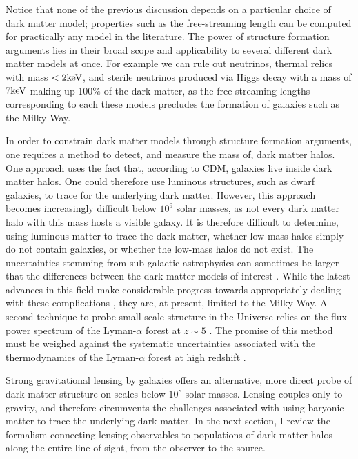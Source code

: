 Notice that none of the previous discussion depends on a particular choice of dark matter model; properties such as the free-streaming length can be computed for practically any model in the literature. The power of structure formation arguments lies in their broad scope and applicability to several different dark matter models at once. For example we can rule out neutrinos, thermal relics with mass $< 2 \rm{keV}$, and sterile neutrinos produced via Higgs decay with a mass of $7 \rm{keV}$ \cite{Viel13,AbazaijanKusenko19} making up 100$\%$ of the dark matter, as the free-streaming lengths corresponding to each these models precludes the formation of galaxies such as the Milky Way. 

In order to constrain dark matter models through structure formation arguments, one requires a method to detect, and measure the mass of, dark matter halos. One approach uses the fact that, according to CDM, galaxies live inside dark matter halos. One could therefore use luminous structures, such as dwarf galaxies,  to trace for the underlying dark matter. However, this approach becomes increasingly difficult below $10^9$ solar masses, as not every dark matter halo with this mass hosts a visible galaxy. It is therefore difficult to determine, using luminous matter to trace the dark matter, whether low-mass halos simply do not contain galaxies, or whether the low-mass halos do not exist. The uncertainties stemming from sub-galactic astrophysics can sometimes be larger that the differences between the dark matter models of interest \cite{Nierenberg++16}. While the latest advances in this field make considerable progress towards appropriately dealing with these complications \cite{Nadler++19}, they are, at present, limited to the Milky Way. A second technique to probe small-scale structure in the Universe relies on the flux power spectrum of the Lyman-$\alpha$ forest at $z \sim 5$ \cite{Viel13,Irsic++17}. The promise of this method must be weighed against the systematic uncertainties associated with the thermodynamics of the Lyman-$\alpha$ forest at high redshift \cite{Garzilli++19}. 

Strong gravitational lensing by galaxies offers an alternative, more direct probe of dark matter structure on scales below $10^8$ solar masses. Lensing couples only to gravity, and therefore circumvents the challenges associated with using baryonic matter to trace the underlying dark matter. In the next section, I review the formalism connecting lensing observables to populations of dark matter halos along the entire line of sight, from the observer to the source. 

